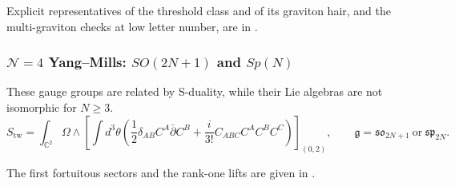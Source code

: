 \documentclass[11pt]{article}
\numberwithin{equation}{section}
\numberwithin{figure}{section}
\numberwithin{table}{section}
\begin{document}
Explicit representatives of the threshold class and of its graviton hair, and the multi-graviton checks at low letter number, are in \cite[supplement, Sections S8.2 and S8.3]{Repo}.

\subsubsection{$\mathcal N=4$ Yang--Mills: $SO(2N+1)$ and $Sp(N)$}\label{sec-results-SOSp}

These gauge groups are related by S-duality, while their Lie algebras are not isomorphic for $N\ge3$.
\begin{equation}\label{local-ch9-sosp-action}
S_{\mathrm{tw}}=\int_{\mathbb C^2}\Omega\wedge
\left[\int d^3\theta\left(\frac12\delta_{AB}C^A\bar\partial C^B
+\frac{i}{3!}C_{ABC}C^AC^BC^C\right)\right]_{(0,2)},
\qquad\mathfrak g=\mathfrak{so}_{2N+1}\ \text{or}\ \mathfrak{sp}_{2N}.
\end{equation}

The first fortuitous sectors and the rank-one lifts are given in \cite[supplement, Sections S3.1 and S3.2]{Repo}.
\end{document}
